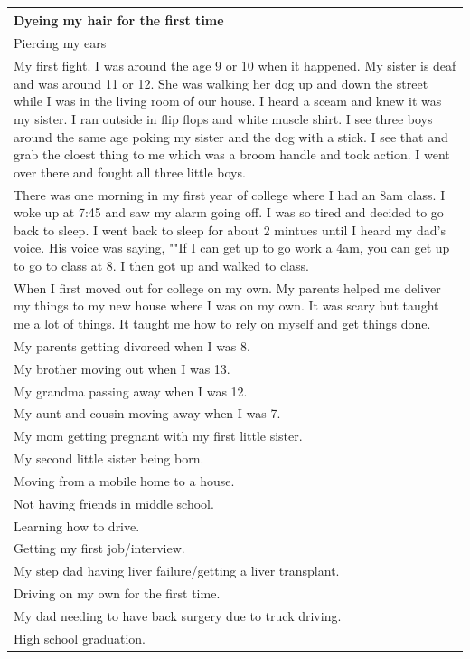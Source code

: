 \documentclass[
  .7em,
  letterpaper,
  DIV=11,
  numbers=noendperiod]{scrartcl}
\begin{document}
\begin{table}
\begin{tabular}{l}
\hline
Dyeing my hair for the first time\\
\hline
Piercing my ears\\
\hline
My first fight. I was around the age 9 or 10 when it happened. My sister is deaf and was around 11 or 12. She was walking her dog up and down the street while I was in the living room of our house. I heard a sceam and knew it was my sister. I ran outside in flip flops and white muscle shirt. I see three boys around the same age poking my sister and the dog with a stick. I see that and grab the cloest thing to me which was a broom handle and took action. I went over there and fought all three little boys.\\
\hline
There was one morning in my first year of college where I had an 8am class. I woke up at 7:45 and saw my alarm going off. I was so tired and decided to go back to sleep. I went back to sleep for about 2 mintues until I heard my dad's voice. His voice was saying, ""If I can get up to go work a 4am, you can get up to go to class at 8. I then got up and walked to class.\\
\hline
When I first moved out for college on my own. My parents helped me deliver my things to my new house where I was on my own. It was scary but taught me a lot of things. It taught me how to rely on myself and get things done.\\
\hline
My parents getting divorced when I was 8.\\
\hline
My brother moving out when I was 13.\\
\hline
My grandma passing away when I was 12.\\
\hline
My aunt and cousin moving away when I was 7.\\
\hline
My mom getting pregnant with my first little sister.\\
\hline
My second little sister being born.\\
\hline
Moving from a mobile home to a house.\\
\hline
Not having friends in middle school.\\
\hline
Learning how to drive.\\
\hline
Getting my first job/interview.\\
\hline
My step dad having liver failure/getting a liver transplant.\\
\hline
Driving on my own for the first time.\\
\hline
My dad needing to have back surgery due to truck driving.\\
\hline
High school graduation.\\

\end{tabular}
\end{table}
\end{document}
